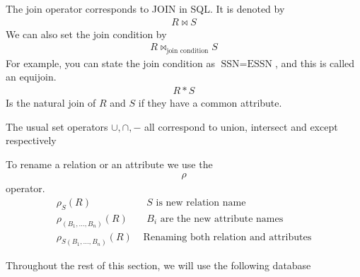 \documentclass[a4paper]{article}
\theoremstyle{plain}
\theoremstyle{definition}
\newtheorem{defn}{Definition}[section]
\theoremstyle{remark}
\begin{document}
\begin{tcolorbox}[colback=black!3!white,colframe=black!60!white,title=\begin{defn}Join \label{Join}\end{defn}]
The join operator corresponds to JOIN in SQL. It is denoted by
\begin{align}
R \bowtie S
\end{align}
We can also set the join condition by
\begin{align}
	R \bowtie_{\text{join condition}} S
\end{align}
For example, you can state the join condition as $\text{SSN}=\text{ESSN}$, and this is called an equijoin.
\begin{align}
	R * S	
\end{align}
Is the natural join of $R$ and $S$ if they have a common attribute.
\end{tcolorbox}
\begin{tcolorbox}[colback=black!3!white,colframe=black!60!white,title=\begin{defn}Set Operators \label{Set Operators}\end{defn}]
The usual set operators $\cup , \cap , - $ all correspond to union, intersect and except respectively
\end{tcolorbox}
\begin{tcolorbox}[colback=black!3!white,colframe=black!60!white,title=\begin{defn}Renaming \label{Renaming}\end{defn}]
To rename a relation or an attribute we use the
\begin{align}
\rho
\end{align}
operator.
\begin{align}
	\rho_S(R) & \text{ $S$ is new relation name}\\
	\rho_{(B_1,\ldots,B_n)}(R) & \text{ $B_i$ are the new attribute names}\\
	\rho_{S(B_1,\ldots,B_n)}(R) & \text{ Renaming both relation and attributes}
\end{align}
\end{tcolorbox}
Throughout the rest of this section, we will use the following database
\end{document}
